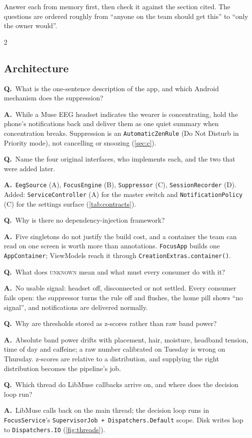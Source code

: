 \documentclass[10pt,a4paper]{article}
\newcommand{\code}[1]{\texttt{#1}}                  %
\newcommand{\state}[1]{\textsc{\small #1}}          %
\newcounter{qnum}
\newcommand{\Q}[2]{\stepcounter{qnum}\par\medskip\noindent
  \textbf{Q\theqnum.}\ #1\par\nobreak\smallskip\noindent
  {\color{teal}\textbf{A.}}\ #2\par}
\begin{document}
Answer each from memory first, then check it against the section cited. The questions are
ordered roughly from ``anyone on the team should get this'' to ``only the owner would''.
\begin{multicols}{2}\small

\subsection*{Architecture}

\Q{What is the one-sentence description of the app, and which Android mechanism does the
suppression?}{While a Muse EEG headset indicates the wearer is concentrating, hold the phone's
notifications back and deliver them as one quiet summary when concentration breaks. Suppression is
an \code{AutomaticZenRule} (Do Not Disturb in Priority mode), not cancelling or snoozing
(\cref{sec:c}).}

\Q{Name the four original interfaces, who implements each, and the two that were added
later.}{\code{EegSource} (A), \code{FocusEngine} (B), \code{Suppressor} (C),
\code{SessionRecorder} (D). Added: \code{ServiceController} (A) for the master switch and
\code{NotificationPolicy} (C) for the settings surface (\cref{tab:contracts}).}

\Q{Why is there no dependency-injection framework?}{Five singletons do not justify the build cost,
and a container the team can read on one screen is worth more than annotations. \code{FocusApp}
builds one \code{AppContainer}; ViewModels reach it through \code{CreationExtras.container()}.}

\Q{What does \state{unknown} mean and what must every consumer do with it?}{No usable signal:
headset off, disconnected or not settled. Every consumer fails open: the suppressor turns the rule
off and flushes, the home pill shows ``no signal'', and notifications are delivered normally.}

\Q{Why are thresholds stored as z-scores rather than raw band power?}{Absolute band power drifts
with placement, hair, moisture, headband tension, time of day and caffeine; a raw number calibrated
on Tuesday is wrong on Thursday. z-scores are relative to a distribution, and supplying the right
distribution becomes the pipeline's job.}

\Q{Which thread do LibMuse callbacks arrive on, and where does the decision loop run?}{LibMuse
calls back on the main thread; the decision loop runs in \code{FocusService}'s
\code{SupervisorJob + Dispatchers.Default} scope. Disk writes hop to \code{Dispatchers.IO}
(\cref{fig:threads}).}


\end{multicols}
\end{document}
